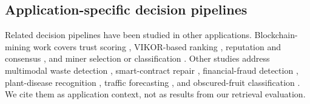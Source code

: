 \subsection{Application-specific decision pipelines}
Related decision pipelines have been studied in other applications. Blockchain-mining work covers trust scoring \cite{puppala2023trust,puppala2023cluster}, VIKOR-based ranking \cite{puppala2024vikor}, reputation and consensus \cite{puppala2024reputation,puppala2025consensus}, and miner selection or classification \cite{puppala2024smnst,puppala2024svm}. Other studies address multimodal waste detection \cite{puppala2025marine}, smart-contract repair \cite{sravanthi2026incident}, financial-fraud detection \cite{sravanthi2025fraud}, plant-disease recognition \cite{sravanthi2025plant}, traffic forecasting \cite{sravanthi2025traffic}, and obscured-fruit classification \cite{sravanthi2026harvest}. We cite them as application context, not as results from our retrieval evaluation.
